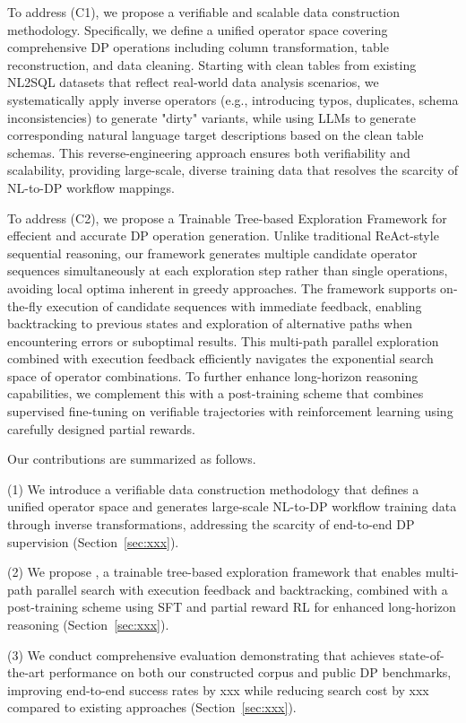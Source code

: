 To address (C1), we propose a verifiable and scalable data construction methodology. Specifically, we define a unified operator space covering comprehensive DP operations including column transformation, table reconstruction, and data cleaning. Starting with clean tables from existing NL2SQL datasets that reflect real-world data analysis scenarios, we systematically apply inverse operators (e.g., introducing typos, duplicates, schema inconsistencies) to generate "dirty" variants, while using LLMs to generate corresponding natural language target descriptions based on the clean table schemas. This reverse-engineering approach ensures both verifiability and scalability, providing large-scale, diverse training data that resolves the scarcity of NL-to-DP workflow mappings.

To address (C2), we propose a Trainable Tree-based Exploration Framework for effecient and accurate DP operation generation.
Unlike traditional ReAct-style sequential reasoning, our framework generates multiple candidate operator sequences simultaneously at each exploration step rather than single operations, avoiding local optima inherent in greedy approaches. The framework supports on-the-fly execution of candidate sequences with immediate feedback, enabling backtracking to previous states and exploration of alternative paths when encountering errors or suboptimal results. This multi-path parallel exploration combined with execution feedback efficiently navigates the exponential search space of operator combinations. To further enhance long-horizon reasoning capabilities, we complement this with a post-training scheme that combines supervised fine-tuning on verifiable trajectories with reinforcement learning using carefully designed partial rewards.

 Our contributions are summarized as follows.

(1) We introduce a verifiable data construction methodology that defines a unified operator space and generates large-scale NL-to-DP workflow training data through inverse transformations, addressing the scarcity of end-to-end DP supervision (Section~\ref{sec:xxx}).

(2) We propose \sys, a trainable tree-based exploration framework that enables multi-path parallel search with execution feedback and backtracking, combined with a post-training scheme using SFT and partial reward RL for enhanced long-horizon reasoning (Section~\ref{sec:xxx}). 

(3) We conduct comprehensive evaluation demonstrating that \sys achieves state-of-the-art performance on both our constructed corpus and public DP benchmarks, improving end-to-end success rates by xxx while reducing search cost by xxx compared to existing approaches (Section~\ref{sec:xxx}).


% 
